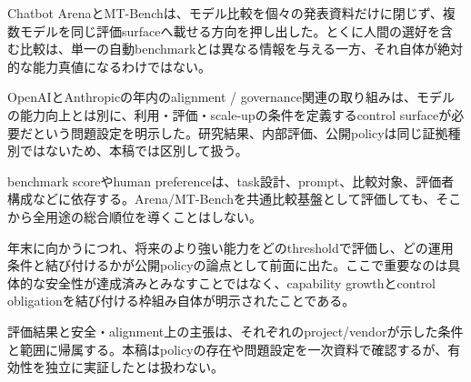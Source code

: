 
Chatbot ArenaとMT-Benchは、モデル比較を個々の発表資料だけに閉じず、複数モデルを同じ評価surfaceへ載せる方向を押し出した。とくに人間の選好を含む比較は、単一の自動benchmarkとは異なる情報を与える一方、それ自体が絶対的な能力真値になるわけではない。\autocite{src-14f8acc117f1,src-1df7a91d31ec,src-b2d10cbd609c}


OpenAIとAnthropicの年内のalignment / governance関連の取り組みは、モデルの能力向上とは別に、利用・評価・scale-upの条件を定義するcontrol surfaceが必要だという問題設定を明示した。研究結果、内部評価、公開policyは同じ証拠種別ではないため、本稿では区別して扱う。\autocite{src-25adcaa1c831,src-394ea6d17701,src-8f63dfa1697f,src-a1c8df89a3c9,src-b276b4af9d56,src-b6a5fdb87e9f}


benchmark scoreやhuman preferenceは、task設計、prompt、比較対象、評価者構成などに依存する。Arena/MT-Benchを共通比較基盤として評価しても、そこから全用途の総合順位を導くことはしない。\autocite{src-14f8acc117f1,src-1df7a91d31ec,src-b2d10cbd609c}


年末に向かうにつれ、将来のより強い能力をどのthresholdで評価し、どの運用条件と結び付けるかが公開policyの論点として前面に出た。ここで重要なのは具体的な安全性が達成済みとみなすことではなく、capability growthとcontrol obligationを結び付ける枠組み自体が明示されたことである。\autocite{src-25adcaa1c831,src-394ea6d17701,src-8f63dfa1697f,src-a1c8df89a3c9,src-b276b4af9d56,src-b6a5fdb87e9f}


\begin{claimboundary}
評価結果と安全・alignment上の主張は、それぞれのproject/vendorが示した条件と範囲に帰属する。本稿はpolicyの存在や問題設定を一次資料で確認するが、有効性を独立に実証したとは扱わない。\autocite{src-25adcaa1c831,src-a1c8df89a3c9,src-b276b4af9d56,src-b6a5fdb87e9f}
\end{claimboundary}
